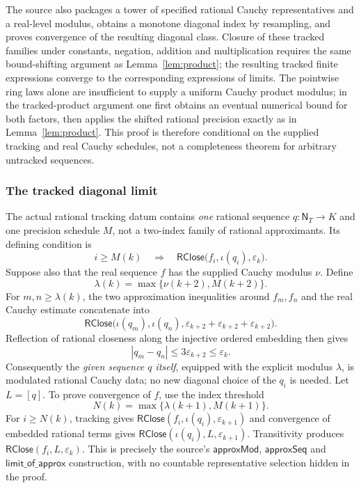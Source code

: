 \documentclass[11pt,reqno]{amsart}
\theoremstyle{definition}\newtheorem{definition}[theorem]{Definition}
\theoremstyle{remark}\newtheorem{remark}[theorem]{Remark}
\newcommand{\N}{\mathsf N_T}\newcommand{\Z}{\mathsf Z_T}\newcommand{\Q}{\mathsf Q_T}\newcommand{\RR}{\mathsf R}
\newcommand{\eps}{\varepsilon}
\begin{document}
The source also packages a tower of specified rational Cauchy representatives and a real-level modulus, obtains a monotone diagonal index by resampling, and proves convergence of the resulting diagonal class. Closure of these tracked families under constants, negation, addition and multiplication requires the same bound-shifting argument as Lemma~\ref{lem:product}; the resulting tracked finite expressions converge to the corresponding expressions of limits. The pointwise ring laws alone are insufficient to supply a uniform Cauchy product modulus; in the tracked-product argument one first obtains an eventual numerical bound for both factors, then applies the shifted rational precision exactly as in Lemma~\ref{lem:product}. This proof is therefore conditional on the supplied tracking and real Cauchy schedules, not a completeness theorem for arbitrary untracked sequences.


\medskip
\subsubsection*{The tracked diagonal limit}\label{supp:13-2}
The actual rational tracking datum contains \emph{one} rational sequence $q:\N\to K$ and one precision schedule $M$, not a two-index family of rational approximants. Its defining condition is
\[
i\ge M(k)\quad\Longrightarrow\quad
\mathsf{RClose}\bigl(f_i,\iota(q_i),\eps_k\bigr).
\]
Suppose also that the real sequence $f$ has the supplied Cauchy modulus $\nu$. Define
\[
\lambda(k)=\max\{\nu(k+2),M(k+2)\}.
\]
For $m,n\ge\lambda(k)$, the two approximation inequalities around $f_m,f_n$ and the real Cauchy estimate concatenate into
\[
\mathsf{RClose}\bigl(\iota(q_m),\iota(q_n),
\eps_{k+2}+\eps_{k+2}+\eps_{k+2}\bigr).
\]
Reflection of rational closeness along the injective ordered embedding then gives
\[
|q_m-q_n|\le3\eps_{k+2}\le\eps_k.
\]
Consequently the \emph{given sequence $q$ itself}, equipped with the explicit modulus $\lambda$, is modulated rational Cauchy data; no new diagonal choice of the $q_i$ is needed. Let $L=[q]$. To prove convergence of $f$, use the index threshold
\[
N(k)=\max\{\lambda(k+1),M(k+1)\}.
\]
For $i\ge N(k)$, tracking gives $\mathsf{RClose}(f_i,\iota(q_i),\eps_{k+1})$ and convergence of embedded rational terms gives $\mathsf{RClose}(\iota(q_i),L,\eps_{k+1})$. Transitivity produces $\mathsf{RClose}(f_i,L,\eps_k)$. This is precisely the source's $\mathsf{approxMod}$, $\mathsf{approxSeq}$ and $\mathsf{limit\_of\_approx}$ construction, with no countable representative selection hidden in the proof.
\medskip
\medskip
\end{document}
